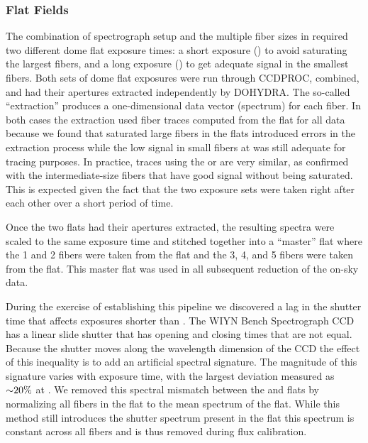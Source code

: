 \subsubsection{Flat Fields}
\label{891_1:sec:flats}

The combination of spectrograph setup and the multiple fiber sizes in
\GP required two different dome flat exposure times: a short exposure
() to avoid saturating the largest fibers, and a long
exposure () to get adequate signal in the smallest fibers.
Both sets of dome flat exposures were run through CCDPROC, combined,
and had their apertures extracted independently by DOHYDRA.  The
so-called ``extraction'' produces a one-dimensional data vector
(spectrum) for each fiber. In both cases the extraction used fiber
traces computed from the  flat for all data because we found
that saturated large fibers in the  flats introduced errors
in the extraction process while the low signal in small fibers at
 was still adequate for tracing purposes. In practice,
traces using the  or  are very similar, as
confirmed with the intermediate-size fibers that have good signal
without being saturated. This is expected given the fact that the two
exposure sets were taken right after each other over a short period of
time.

Once the two flats had their apertures extracted, the resulting
spectra were scaled to the same exposure time and stitched together
into a ``master'' flat where the 1 and 2 fibers were
taken from the  flat and the 3, 4, and
5 fibers were taken from the  flat. This master flat
was used in all subsequent reduction of the on-sky data.

During the exercise of establishing this pipeline we discovered a lag
in the shutter time that affects exposures shorter than . The WIYN Bench Spectrograph CCD has a linear slide shutter
that has opening and closing times that are not equal. Because the
shutter moves along the wavelength dimension of the CCD the effect of
this inequality is to add an artificial spectral signature. The
magnitude of this signature varies with exposure time, with the
largest deviation measured as ${\sim} 20\%$ at . We removed
this spectral mismatch between the  and  flats by
normalizing all fibers in the  flat to the mean spectrum of
the  flat. While this method still introduces the shutter
spectrum present in the  flat this spectrum is constant
across all fibers and is thus removed during flux calibration.

